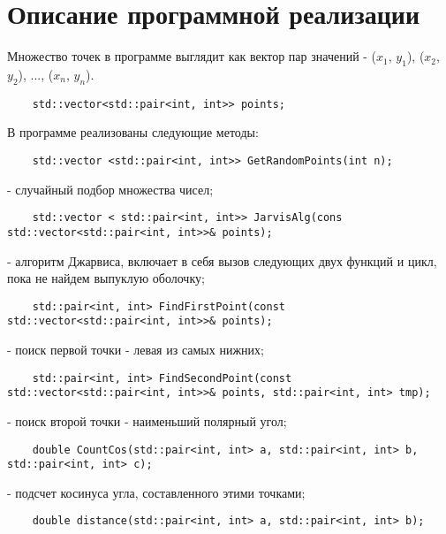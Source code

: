 \documentclass{article}
\begin{document}
\newpage

\section{Описание программной реализации}
Множество точек в программе выглядит как вектор пар значений - {($x_{1}$, $y_{1}$), ($x_{2}$, $y_{2}$), ..., ($x_{n}$, $y_{n}$)}.

\begin{lstlisting}
	std::vector<std::pair<int, int>> points;
\end{lstlisting}

\par В программе реализованы следующие методы:

\begin{lstlisting}
	std::vector <std::pair<int, int>> GetRandomPoints(int n);
\end{lstlisting}

- случайный подбор множества чисел;

\begin{lstlisting}
	std::vector < std::pair<int, int>> JarvisAlg(cons std::vector<std::pair<int, int>>& points);
\end{lstlisting}

- алгоритм Джарвиса, включает в себя вызов следующих двух функций и цикл, пока не найдем выпуклую оболочку;

\begin{lstlisting}
	std::pair<int, int> FindFirstPoint(const std::vector<std::pair<int, int>>& points);
\end{lstlisting}

- поиск первой точки - левая из самых нижних;

\begin{lstlisting}
	std::pair<int, int> FindSecondPoint(const std::vector<std::pair<int, int>>& points, std::pair<int, int> tmp);
\end{lstlisting}

- поиск второй точки - наименьший полярный угол;

\begin{lstlisting}
	double CountCos(std::pair<int, int> a, std::pair<int, int> b, std::pair<int, int> c);
\end{lstlisting}

- подсчет косинуса угла, составленного этими точками;

\begin{lstlisting}
	double distance(std::pair<int, int> a, std::pair<int, int> b);
\end{lstlisting}
\end{document}
